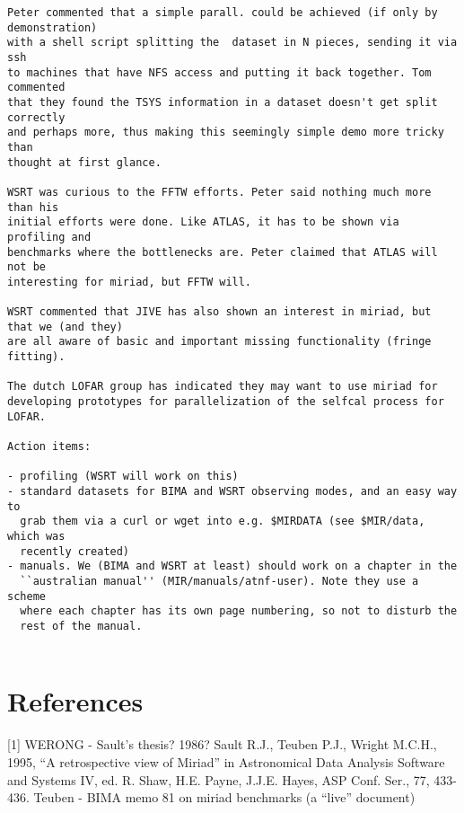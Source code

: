 \begin{verbatim}
Peter commented that a simple parall. could be achieved (if only by demonstration)
with a shell script splitting the  dataset in N pieces, sending it via ssh
to machines that have NFS access and putting it back together. Tom commented
that they found the TSYS information in a dataset doesn't get split correctly
and perhaps more, thus making this seemingly simple demo more tricky than
thought at first glance.

WSRT was curious to the FFTW efforts. Peter said nothing much more than his
initial efforts were done. Like ATLAS, it has to be shown via profiling and
benchmarks where the bottlenecks are. Peter claimed that ATLAS will not be
interesting for miriad, but FFTW will.

WSRT commented that JIVE has also shown an interest in miriad, but that we (and they)
are all aware of basic and important missing functionality (fringe fitting). 

The dutch LOFAR group has indicated they may want to use miriad for
developing prototypes for parallelization of the selfcal process for
LOFAR.

Action items:

- profiling (WSRT will work on this)
- standard datasets for BIMA and WSRT observing modes, and an easy way to
  grab them via a curl or wget into e.g. $MIRDATA (see $MIR/data, which was
  recently created)
- manuals. We (BIMA and WSRT at least) should work on a chapter in the
  ``australian manual'' (MIR/manuals/atnf-user). Note they use a scheme
  where each chapter has its own page numbering, so not to disturb the
  rest of the manual.


\end{verbatim}

\section*{References}

[1] WERONG - Sault's thesis? 1986?
\newline
[2] Sault R.J., Teuben P.J., Wright M.C.H., 1995,
 ``A retrospective view of Miriad'' in 
Astronomical Data Analysis Software and Systems IV, 
ed. R. Shaw, H.E. Payne, J.J.E. Hayes, ASP Conf. Ser., 77, 433-436.
\newline
[3] Teuben - BIMA memo 81 on miriad benchmarks (a ``live'' document)
\newline



